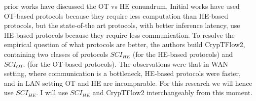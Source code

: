 \documentclass[../thesis.tex]{subfiles}
\begin{document}
prior works have discussed the OT vs HE conundrum. Initial works have used OT-based protocols because they require less computation than HE-based protocols, but the state-of-the art protocols, with better inference latency, use HE-based protocols because they require less communication. To resolve the empirical question of what protocols are better, the authors build CrypTFlow2, containing two classes of protocols $SCI_{HE}$ (for the HE-based protocols) and $SCI_{OT}$. (for the OT-based protocols). The observations were that in WAN setting, where communication is a bottleneck, HE-based protocols were faster, and in LAN setting OT and HE are incomparable. For this research we will hence use $SCI_{HE}$. I will use $SCI_{HE}$ and CrypTFlow2 interchangeably from this moment.
\end{document}
